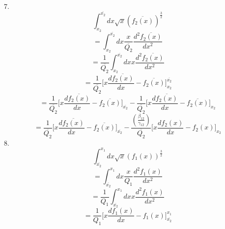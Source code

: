 \documentclass[fleqn, 10pt]{article}
\begin{document}
 7.              \begin{equation*}
                \int^{\overline{x_{2}}}_{x_{2}} dx \sqrt{x} (\overline{f_{2}(x)})^\frac{3}{2} 
                \end{equation*}
                \begin{equation*}
                = \int^{\overline{x_{2}}}_{x_{2}} dx \frac{x}{\overline{Q_{2}}} \frac{d^2\overline{f_{2}(x)}}{dx^2} 
                \end{equation*}
                \begin{equation*}
                = \frac{1}{\overline{Q_{2}}} \int^{\overline{x_{2}}}_{x_{2}} dx x \frac{d^2\overline{f_{2}(x)}}{dx^2}
                \end{equation*}
                \begin{equation*}
                = \frac{1}{\overline{Q_{2}}} \biggl[ x \frac{d\overline{f_{2}(x)}}{dx} - \overline{f_{2}(x)} \biggr]^{\overline{x_{2}}}_{x_{2}}
                \end{equation*}
                \begin{equation*}
                    = \frac{1}{\overline{Q_{2}}} \biggl[x \frac{d\overline{f_{2}(x)}}{dx} - \overline{f_{2}(x)} \biggr]_{\overline{x_{2}}} - \frac{1}{\overline{Q_{2}}} \biggl[x\frac{d\overline{f_{2}(x)}}{dx} - \overline{f_{2}(x)} \biggr]_{x_{2}}
                \end{equation*}
                \begin{equation}
                    = \frac{1}{\overline{Q_{2}}} \biggl[x \frac{d\overline{f_{2}(x)}}{dx} - \overline{f_{2}(x)} \biggr]_{\overline{x_{2}}} - \frac{\left(\frac{\beta_{12}}{\gamma_{1\overline{2}}}\right)}{\overline{Q_{2}}} \Biggl[x \frac{df_{2}(x)}{dx} - f_{2}(x) \Biggr]_{x_{2}}
                \end{equation}
    8.            \begin{equation*}
               \int^{x_1}_{\overline{x_{2}}} dx \sqrt{x} (f_1(x))^\frac{3}{2} 
           \end{equation*}
           \begin{equation*}
               = \int^{x_1}_{\overline{x_{2}}} dx \frac{x}{Q_1} \frac{d^2f_1(x)}{dx^2} 
           \end{equation*}
           \begin{equation*}
               = \frac{1}{Q_1} \int^{x_1}_{\overline{x_{2}}} dx x \frac{d^2f_1(x)}{dx^2} 
           \end{equation*}
           \begin{equation*}
               = \frac{1}{Q_1} \biggl[ x \frac{df_1(x)}{dx} - f_1(x) \biggr]^{x_1}_{\overline{x_{2}}} 
           \end{equation*}
\end{document}
